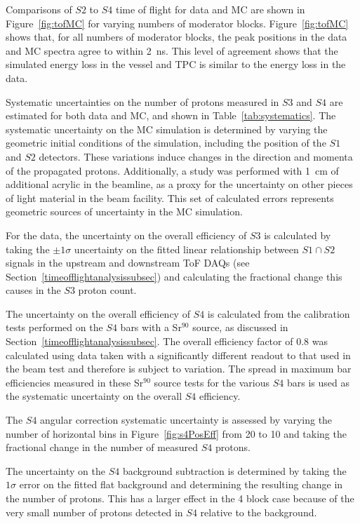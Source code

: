 Comparisons of $\mathit{S2}$ to $\mathit{S4}$ time of flight for data and MC are shown in Figure~\ref{fig:tofMC} for varying numbers of moderator blocks.
Figure~\ref{fig:tofMC} shows that, for all numbers of moderator blocks, the peak positions in the data and MC spectra agree to within 2~ns.
This level of agreement shows that the simulated energy loss in the vessel and TPC is similar to the energy loss in the data.
  
Systematic uncertainties on the number of protons measured in $\mathit{S3}$ and $\mathit{S4}$ are estimated for both data and MC, and shown in Table~\ref{tab:systematics}.
The systematic uncertainty on the MC simulation is determined by varying the geometric initial conditions of the simulation, including the position of the $\mathit{S1}$ and $\mathit{S2}$ detectors.
These variations induce changes in the direction and momenta of the propagated protons.
Additionally, a study was performed with 1~cm of additional acrylic in the beamline, as a proxy for the uncertainty on other pieces of light material in the beam facility.
This set of calculated errors represents geometric sources of uncertainty in the MC simulation.

For the data, the uncertainty on the overall efficiency of $\mathit{S3}$ is calculated by taking the $\pm1\sigma$ uncertainty on the fitted linear relationship between $\mathit{S1} \cap \mathit{S2}$ signals in the upstream and downstream ToF DAQs (see Section~\ref{timeofflightanalysissubsec}) and calculating the fractional change this causes in the $\mathit{S3}$ proton count.

The uncertainty on the overall efficiency of $\mathit{S4}$ is calculated from the calibration tests performed on the $\mathit{S4}$ bars with a Sr$^{90}$ source, as discussed in Section~\ref{timeofflightanalysissubsec}.
The overall efficiency factor of 0.8 was calculated using data taken with a significantly different readout to that used in the beam test and therefore is subject to variation. 
The spread in maximum bar efficiencies measured in these Sr$^{90}$ source tests for the various $\mathit{S4}$ bars is used as the systematic uncertainty on the overall $\mathit{S4}$ efficiency.

The $\mathit{S4}$ angular correction systematic uncertainty is assessed by varying the number of horizontal bins in Figure~\ref{fig:s4PosEff} from 20 to 10 and taking the fractional change in the number of measured $\mathit{S4}$ protons.

The uncertainty on the $\mathit{S4}$ background subtraction is determined by taking the $1\sigma$ error on the fitted flat background and determining the resulting change in the number of protons.
This has a larger effect in the 4 block case because of the very small number of protons detected in $\mathit{S4}$ relative to the background.

